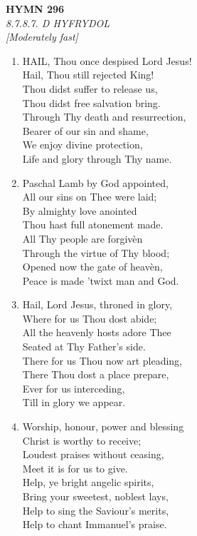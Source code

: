 \newpage
\begin{center}
    {\Large \textbf{HYMN 296}}
    \\
    \textit{8.7.8.7. D HYFRYDOL}
    \\
    \textit{\small [Moderately fast]}
\end{center}
\vspace{1em}

\begin{enumerate}
    \item HAIL, Thou once despised Lord Jesus! \\
        Hail, Thou still rejected King! \\
        Thou didst suffer to release us, \\
        Thou didst free salvation bring. \\
        Through Thy death and resurrection, \\
        Bearer of our sin and shame, \\
        We enjoy divine protection, \\
        Life and glory through Thy name.

    \item Paschal Lamb by God appointed, \\
        All our sins on Thee were laid; \\
        By almighty love anointed \\
        Thou hast full atonement made. \\
        All Thy people are forgiv\`en \\
        Through the virtue of Thy blood; \\
        Opened now the gate of heav\`en, \\
        Peace is made 'twixt man and God.

    \item Hail, Lord Jesus, throned in glory, \\
        Where for us Thou dost abide; \\
        All the heavenly hosts adore Thee \\
        Seated at Thy Father's side. \\
        There for us Thou now art pleading, \\
        There Thou dost a place prepare, \\
        Ever for us interceding, \\
        Till in glory we appear.

    \item Worship, honour, power and blessing \\
        Christ is worthy to receive; \\
        Loudest praises without ceasing, \\
        Meet it is for us to give. \\
        Help, ye bright angelic spirits, \\
        Bring your sweetest, noblest lays, \\
        Help to sing the Saviour's merits, \\
        Help to chant Immanuel's praise.

\end{enumerate}

